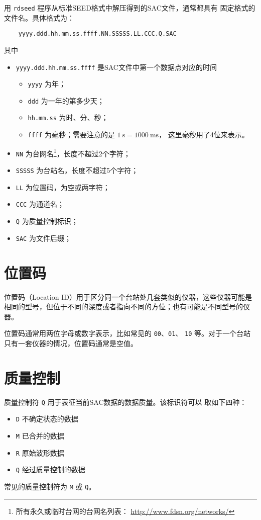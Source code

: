 用 \texttt{rdseed} 程序从标准SEED格式中解压得到的SAC文件，通常都具有
固定格式的文件名。具体格式为：
\begin{verbatim}
    yyyy.ddd.hh.mm.ss.ffff.NN.SSSSS.LL.CCC.Q.SAC
\end{verbatim}
其中
\begin{itemize}
\item \texttt{yyyy.ddd.hh.mm.ss.ffff} 是SAC文件中第一个数据点对应的时间
    \begin{itemize}
    \item \texttt{yyyy} 为年；
    \item \texttt{ddd} 为一年的第多少天；
    \item \texttt{hh.mm.ss} 为时、分、秒；
    \item \texttt{ffff} 为毫秒；需要注意的是 $\SI{1}{\s}=\SI{1000}{\ms}$，
        这里毫秒用了4位来表示。
    \end{itemize}
\item \texttt{NN} 为台网名\footnote{所有永久或临时台网的台网名列表：
    \url{http://www.fdsn.org/networks/}}，长度不超过2个字符；
\item \texttt{SSSSS} 为台站名，长度不超过5个字符；
\item \texttt{LL} 为位置码，为空或两字符；
\item \texttt{CCC} 为通道名；
\item \texttt{Q} 为质量控制标识；
\item \texttt{SAC} 为文件后缀；
\end{itemize}

\section{位置码}
位置码（Location ID）用于区分同一个台站处几套类似的仪器，这些仪器可能是
相同的型号，但位于不同的深度或者指向不同的方位；也有可能是不同型号的仪器。

位置码通常用两位字母或数字表示，比如常见的 \texttt{00}、\texttt{01}、
\texttt{10} 等。对于一个台站只有一套仪器的情况，位置码通常是空值。

\section{质量控制}
\label{sec:quality-control}
质量控制符 \texttt{Q} 用于表征当前SAC数据的数据质量。该标识符可以
取如下四种：
\begin{itemize}
\item \texttt{D} 不确定状态的数据
\item \texttt{M} 已合并的数据
\item \texttt{R} 原始波形数据
\item \texttt{Q} 经过质量控制的数据
\end{itemize}
常见的质量控制符为 \texttt{M} 或 \texttt{Q}。

